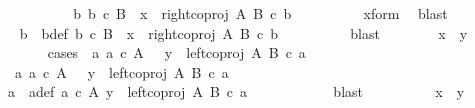 \begin{isabellebody}
\ \ \ \ \ \ \isamarkupfalse%
\ \isamarkupfalse%
\ {\isachardoublequoteopen}{\isasymexists}\ b{\isachardot}{\kern0pt}\ b\ {\isasymin}\isactrlsub c\ B\ {\isasymand}\ x\ {\isacharequal}{\kern0pt}\ right{\isacharunderscore}{\kern0pt}coproj\ A\ B\ {\isasymcirc}\isactrlsub c\ b{\isachardoublequoteclose}\isanewline
\ \ \ \ \ \ \ \ \isamarkupfalse%
\ x{\isacharunderscore}{\kern0pt}form\ \isamarkupfalse%
\ blast\isanewline
\ \ \ \ \ \ \isamarkupfalse%
\ \isamarkupfalse%
\ b\ \ b{\isacharunderscore}{\kern0pt}def{\isacharcolon}{\kern0pt}\ {\isachardoublequoteopen}b\ {\isasymin}\isactrlsub c\ B\ {\isasymand}\ x\ {\isacharequal}{\kern0pt}\ right{\isacharunderscore}{\kern0pt}coproj\ A\ B\ {\isasymcirc}\isactrlsub c\ b{\isachardoublequoteclose}\isanewline
\ \ \ \ \ \ \ \ \isamarkupfalse%
\ blast\isanewline
\ \ \ \ \ \ \isamarkupfalse%
\ {\isachardoublequoteopen}x\ {\isacharequal}{\kern0pt}\ y{\isachardoublequoteclose}\isanewline
\ \ \ \ \ \ \isamarkupfalse%
{\isacharparenleft}{\kern0pt}cases\ {\isachardoublequoteopen}{\isasymexists}\ a{\isachardot}{\kern0pt}\ a\ {\isasymin}\isactrlsub c\ A\ \ {\isasymand}\ y\ {\isacharequal}{\kern0pt}\ left{\isacharunderscore}{\kern0pt}coproj\ A\ B\ {\isasymcirc}\isactrlsub c\ a{\isachardoublequoteclose}{\isacharparenright}{\kern0pt}\isanewline
\ \ \ \ \ \ \ \ \isamarkupfalse%
\ {\isachardoublequoteopen}{\isasymexists}\ a{\isachardot}{\kern0pt}\ a\ {\isasymin}\isactrlsub c\ A\ \ {\isasymand}\ y\ {\isacharequal}{\kern0pt}\ left{\isacharunderscore}{\kern0pt}coproj\ A\ B\ {\isasymcirc}\isactrlsub c\ a{\isachardoublequoteclose}\isanewline
\ \ \ \ \ \ \ \ \isamarkupfalse%
\ \isamarkupfalse%
\ a{\isacharprime}{\kern0pt}\ \ a{\isacharprime}{\kern0pt}{\isacharunderscore}{\kern0pt}def{\isacharcolon}{\kern0pt}\ {\isachardoublequoteopen}a{\isacharprime}{\kern0pt}\ {\isasymin}\isactrlsub c\ A{\isachardoublequoteclose}\ {\isachardoublequoteopen}y\ {\isacharequal}{\kern0pt}\ left{\isacharunderscore}{\kern0pt}coproj\ A\ B\ {\isasymcirc}\isactrlsub c\ a{\isacharprime}{\kern0pt}{\isachardoublequoteclose}\isanewline
\ \ \ \ \ \ \ \ \ \ \isamarkupfalse%
\ blast\isanewline
\ \ \ \ \ \ \ \ \isamarkupfalse%
\ {\isachardoublequoteopen}x\ {\isacharequal}{\kern0pt}\ y{\isachardoublequoteclose}\isanewline
\ \ \ \ \ \ \ \ \isamarkupfalse%
\ {\isacharminus}{\kern0pt}\ \isanewline

\end{isabellebody}
